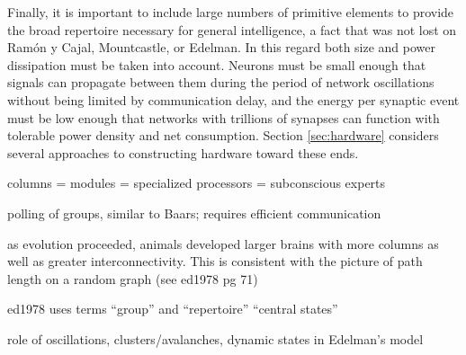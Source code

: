 Finally, it is important to include large numbers of primitive elements to provide the broad repertoire necessary for general intelligence, a fact that was not lost on Ram\'{o}n y Cajal, Mountcastle, or Edelman. In this regard both size and power dissipation must be taken into account. Neurons must be small enough that signals can propagate between them during the period of network oscillations without being limited by communication delay, and the energy per synaptic event must be low enough that networks with trillions of synapses can function with tolerable power density and net consumption. Section \ref{sec:hardware} considers several approaches to constructing hardware toward these ends.

\vspace{3em}
columns = modules = specialized processors = subconscious experts

\vspace{3em}
\cite{ed1978} polling of groups, similar to Baars; requires efficient communication

\vspace{3em}
as evolution proceeded, animals developed larger brains with more columns as well as greater interconnectivity. This is consistent with the picture of path length on a random graph (see ed1978 pg 71)

\vspace{3em}
ed1978 uses terms ``group'' and ``repertoire'' ``central states''

\vspace{3em}
role of oscillations, clusters/avalanches, dynamic states in Edelman's model

\vspace{3em}